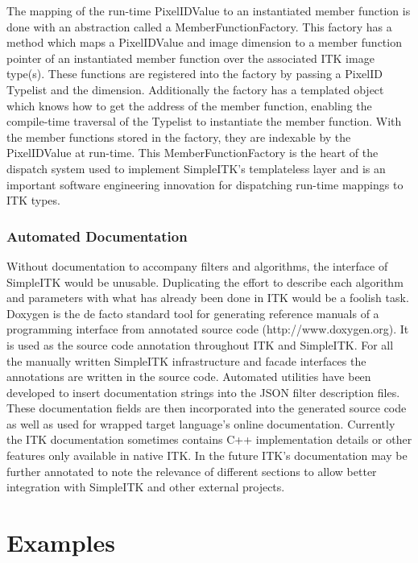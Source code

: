 \documentclass{frontiersMED} %
\begin{document}
The mapping of the run-time PixelIDValue to an instantiated member
function is done with an abstraction called a
MemberFunctionFactory. This factory has a method which maps a
PixelIDValue and image dimension to a member function pointer of an
instantiated member function over the associated ITK image
type(s). These functions are registered into the factory by passing a
PixelID Typelist and the dimension. Additionally the factory has a
templated object which knows how to get the address of  the member
function, enabling the compile-time traversal of the Typelist to
instantiate the member function.  With the member functions stored in
the factory, they are indexable by the PixelIDValue at run-time. This
MemberFunctionFactory is the heart of the dispatch system used to
implement SimpleITK's templateless layer and is an important software
engineering innovation for dispatching run-time mappings to ITK types.

\subsubsection{Automated Documentation}
Without documentation to accompany filters and algorithms, the
interface of SimpleITK would be unusable. Duplicating the effort to
describe each algorithm and parameters with what has already been done
in ITK would be a foolish task. Doxygen is the de facto standard tool
for generating reference manuals of a programming interface from
annotated source code (http://www.doxygen.org). It is used as the source code annotation
throughout ITK and SimpleITK. For all the manually written SimpleITK
infrastructure and facade interfaces the annotations are written in
the source code. Automated utilities have been developed to insert
documentation strings into the JSON filter description files. These
documentation fields are then incorporated into the generated source
code as well as used for wrapped target language's online
documentation. Currently the ITK documentation sometimes contains C++
implementation details or other features only available in native ITK.
In the future ITK's documentation may be further annotated to
note the relevance of different sections to allow better
integration with SimpleITK and other external projects.



\section{Examples}
\end{document}
